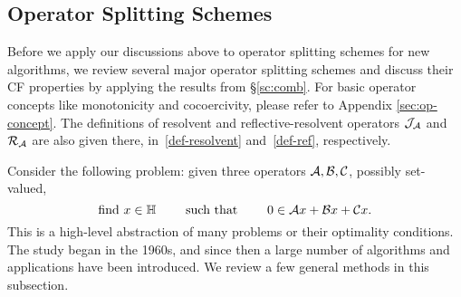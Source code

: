 \subsection{Operator Splitting Schemes}\label{sec:splitting}
Before we apply our discussions above to operator splitting schemes for new algorithms, we review several major operator splitting schemes and discuss their CF properties by applying the results from \S\ref{sc:comb}. For basic operator concepts like monotonicity and cocoercivity, please refer to Appendix \ref{sec:op-concept}. The definitions of resolvent and reflective-resolvent operators ${\mathcal{J}}_{{\mathcal{A}}}$ and ${\mathcal{R}}_{{\mathcal{A}}}$ are also given there, in~\eqref{def-resolvent} and~\eqref{def-ref}, respectively.   %

Consider the following problem: given three operators ${\mathcal{A}},{\mathcal{B}},{\mathcal{C}}$, possibly set-valued,  \begin{equation}\label{eqn:3s_problem}
\text{find } x \in \HH \qquad \text{ such that }  \qquad 0 \in \cA x + \cB x +\cC x.
\end{equation}
This is a high-level abstraction of many problems or their optimality conditions. The study began in the 1960s, and since then a large number of algorithms and applications have been introduced. We review a few general methods in this subsection.

